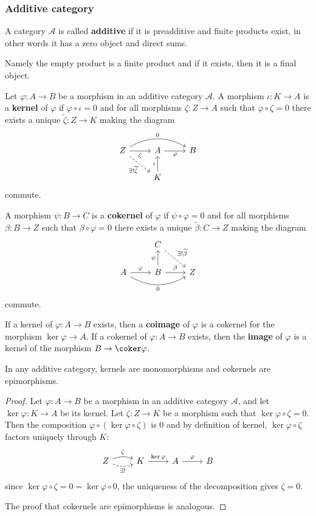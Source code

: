 \subsubsection{Additive category}
\begin{definition}
A category $\mathcal{A}$ is called \textbf{additive} if it is preadditive and finite
products exist, in other words it has a zero object and direct sums.
\end{definition}
Namely the empty product is a finite product and if it exists, then it is a final object.
\begin{definition}
Let $\varphi:A\to B$ be a morphism in an additive category $\mathcal{A}$. A morphism $\iota:K\to A$ is a \textbf{kernel} of $\varphi$ if $\varphi\circ\iota=0$ and for all morphisms $\zeta:Z\to A$ such that $\varphi\circ\zeta=0$ there exists a unique $\widetilde{\zeta}:Z\to K$ making the diagram
\[\begin{tikzcd}
Z\ar[rd,dashed,swap,"\exists !\widetilde{\zeta}"]\ar[r,swap,"\zeta"]\ar[rr,bend left,"0"]&A\ar[r,swap,"\varphi"]&B\\
&K\ar[u,"\iota"]&
\end{tikzcd}\]
commute.\par
A morphism $\psi:B\to C$ is a \textbf{cokernel} of $\varphi$ if $\psi\circ\varphi=0$ and for all morphisms $\beta:B\to Z$ such that $\beta\circ\varphi=0$ there exists a unique $\widetilde{\beta}:C\to Z$ making the diagram
\[\begin{tikzcd}
&C\ar[rd,dashed,"\exists !\widetilde{\beta}"]&\\
A\ar[r,"\varphi"]\ar[rr,swap,bend right,"0"]&B\ar[r,"\beta"]\ar[u,"\psi"]&Z
\end{tikzcd}\]
commute.
\end{definition}
\begin{definition}
If a kernel of $\varphi:A\to B$ exists, then a \textbf{coimage} of $\varphi$ is a cokernel for the morphism $\ker\varphi\to A$. If a cokernel of $\varphi:A\to B$ exists, then the \textbf{image} of $\varphi$ is a kernel of the morphism $B\to\coker\varphi$.
\end{definition}
\begin{lemma}\label{ker is mono}
In any additive category, kernels are monomorphisms and cokernels are epimorphisms.
\end{lemma}
\begin{proof}
Let $\varphi:A\to B$ be a morphism in an additive category $\mathcal{A}$, and let $\ker\varphi:K\to A$ be its kernel. Let $\zeta:Z\to K$ be a morphism such that $\ker\varphi\circ\zeta=0$. Then the composition $\varphi\circ(\ker\varphi\circ\zeta)$ is $0$ and by definition of kernel, $\ker\varphi\circ\zeta$ factors uniquely through $K$:
\[\begin{tikzcd}
Z\ar[r,bend left=20,"\zeta"]\ar[r,dashed,swap,bend right=20,"\exists !"]&K\ar[r,"\ker\varphi"]&A\ar[r,"\varphi"]&B
\end{tikzcd}\]
since $\ker\varphi\circ\zeta=0=\ker\varphi\circ 0$, the uniqueness of the decomposition gives $\zeta=0$.\par
The proof that cokernels are epimorphisms is analogous.
\end{proof}
